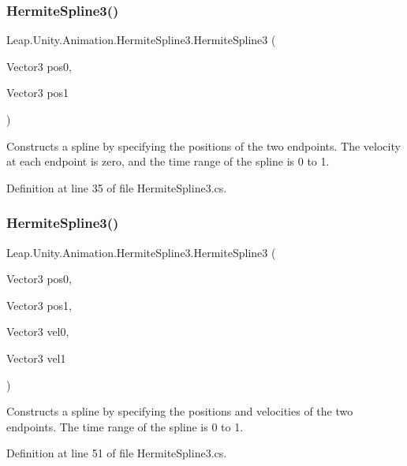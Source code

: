 \subsubsection{\texorpdfstring{HermiteSpline3()}{HermiteSpline3()}\hspace{0.1cm}{\footnotesize\ttfamily [1/4]}}
{\footnotesize\ttfamily Leap.\+Unity.\+Animation.\+Hermite\+Spline3.\+Hermite\+Spline3 (\begin{DoxyParamCaption}\item[{Vector3}]{pos0,  }\item[{Vector3}]{pos1 }\end{DoxyParamCaption})}



Constructs a spline by specifying the positions of the two endpoints. The velocity at each endpoint is zero, and the time range of the spline is 0 to 1. 



Definition at line 35 of file Hermite\+Spline3.\+cs.

\mbox{\label{struct_leap_1_1_unity_1_1_animation_1_1_hermite_spline3_a3e0965b1cb3706781e3c0a77d02bdf30}} 
\subsubsection{\texorpdfstring{HermiteSpline3()}{HermiteSpline3()}\hspace{0.1cm}{\footnotesize\ttfamily [2/4]}}
{\footnotesize\ttfamily Leap.\+Unity.\+Animation.\+Hermite\+Spline3.\+Hermite\+Spline3 (\begin{DoxyParamCaption}\item[{Vector3}]{pos0,  }\item[{Vector3}]{pos1,  }\item[{Vector3}]{vel0,  }\item[{Vector3}]{vel1 }\end{DoxyParamCaption})}



Constructs a spline by specifying the positions and velocities of the two endpoints. The time range of the spline is 0 to 1. 



Definition at line 51 of file Hermite\+Spline3.\+cs.

